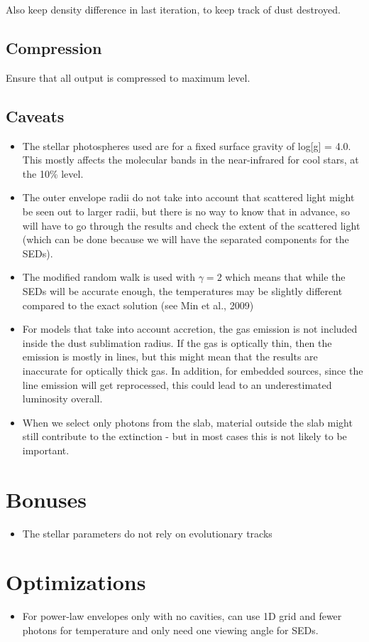 \documentclass[10pt]{article}
\begin{document}
Also keep density difference in last iteration, to keep track of dust destroyed.

\subsection{Compression}

Ensure that all output is compressed to maximum level.

\subsection{Caveats}

\begin{itemize}

\item The stellar photospheres used are for a fixed surface gravity of log[g] = 4.0. This mostly affects the molecular bands in the near-infrared for cool stars, at the 10\% level.

\item The outer envelope radii do not take into account that scattered light might be seen out to larger radii, but there is no way to know that in advance, so will have to go through the results and check the extent of the scattered light (which can be done because we will have the separated components for the SEDs).

\item The modified random walk is used with $\gamma=2$ which means that while the SEDs will be accurate enough, the temperatures may be slightly different compared to the exact solution (see Min et al., 2009)

\item For models that take into account accretion, the gas emission is not included inside the dust sublimation radius. If the gas is optically thin, then the emission is mostly in lines, but this might mean that the results are inaccurate for optically thick gas. In addition, for embedded sources, since the line emission will get reprocessed, this could lead to an underestimated luminosity overall.

\item When we select only photons from the slab, material outside the slab might still contribute to the extinction - but in most cases this is not likely to be important.

\end{itemize}

\section{Bonuses}

\begin{itemize}

\item The stellar parameters do not rely on evolutionary tracks

\end{itemize}

\section{Optimizations}

\begin{itemize}
\item For power-law envelopes only with no cavities, can use 1D grid and fewer photons for temperature and only need one viewing angle for SEDs.
\end{itemize}
\end{document}
